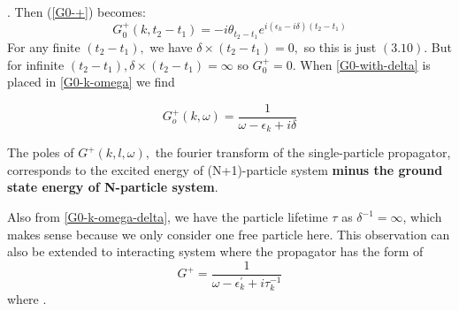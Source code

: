 . Then (\ref{G0-+}) becomes:
\begin{equation}G_{0}^{+}\left(k, t_{2}-t_{1}\right)=-i \theta_{t_{2}-t_{1}}e^{i(\epsilon_k-i\delta)(t_2-t_1)}
\label{G0-with-delta}
\end{equation}
For any finite $\left(t_{2}-t_{1}\right),$ we have $\delta \times\left(t_{2}-t_{1}\right)=0,$ so this is just $(3.10) .$ But for infinite $\left(t_{2}-t_{1}\right), \delta \times\left(t_{2}-t_{1}\right)=\infty$ so $G_{0}^{+}=0 .$ When \ref{G0-with-delta} is placed in \ref{G0-k-omega} we find
\begin{imp}
\begin{equation}G_{o}^{+}(k, \omega)=\frac{1}{\omega-\epsilon_{k}+i \delta}
\label{G0-k-omega-delta}
\end{equation}
\end{imp}
\begin{imp}
The poles of $G^+(k,l,\omega),$ the fourier transform of the single-particle propagator, corresponds to the excited energy of (N+1)-particle system \textbf{minus the ground state energy of N-particle system}.
\end{imp}
Also from \ref{G0-k-omega-delta}, we have the particle lifetime $\tau$ as $\delta^{-1}=\infty$, which makes sense because we only consider one free particle here. This observation can also be extended to interacting system where the propagator has the form of 
\begin{equation}
    G^+=\frac{1}{\omega-\epsilon_k^{\prime}+i\tau_k^{-1}}
\end{equation}
where .

